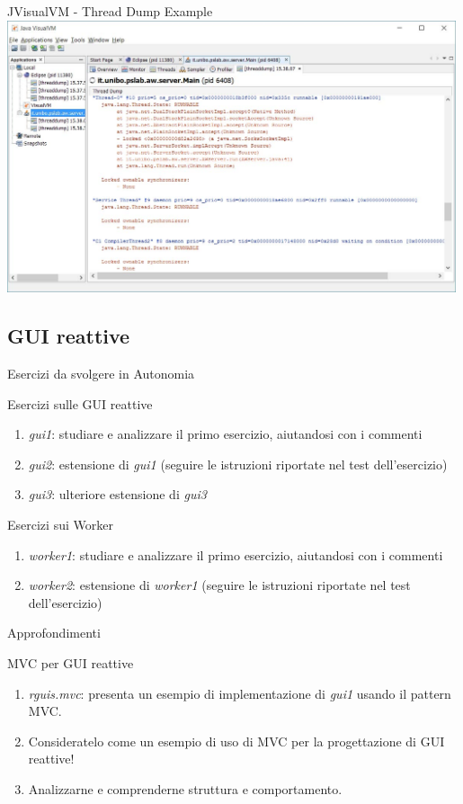 \documentclass[presentation]{beamer}
\begin{document}
\begin{frame}{JVisualVM - Thread Dump Example}
\centering
\includegraphics[width=0.99\textwidth]{img/jvisualvm-3}
\end{frame}

\subsection{GUI reattive}

\begin{frame}{Esercizi da svolgere in Autonomia}
\begin{block}{Esercizi sulle GUI reattive}
\begin{enumerate}
\item \emph{gui1}: studiare e analizzare il primo esercizio, aiutandosi con i commenti
\item \emph{gui2}: estensione di \emph{gui1} (seguire le istruzioni riportate nel test dell'esercizio)
\item \emph{gui3}: ulteriore estensione di \emph{gui3}
\end{enumerate}
\end{block}

\begin{block}{Esercizi sui Worker}
\begin{enumerate}
\item  \emph{worker1}: studiare e analizzare il primo esercizio, aiutandosi con i commenti
\item \emph{worker2}: estensione di \emph{worker1} (seguire le istruzioni riportate nel test dell'esercizio)
\end{enumerate}
\end{block}
\end{frame}

\begin{frame}{Approfondimenti}
\begin{block}{MVC per GUI reattive}
\begin{enumerate}
\item \emph{rguis.mvc}: presenta un esempio di implementazione di \emph{gui1} usando il pattern MVC. 
\item Consideratelo come un esempio di uso di MVC per la progettazione di GUI reattive!
\item Analizzarne e comprenderne struttura e comportamento.
\end{enumerate}
\end{block}

\end{frame}
\end{document}
